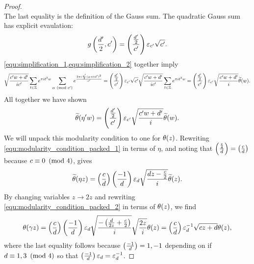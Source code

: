 \documentclass[12pt,reqno,oneside]{amsart}
\begin{document}
\begin{proof}
\begin{equation}
        \end{equation}
        The last equality is the definition of the Gauss sum. The quadratic Gauss sum has explicit evaulation:
        \begin{equation}\label{equ:simplification_2}
            g\left(\frac{d'}{2},c'\right) = \left(\frac{\frac{d'}{2}}{c'}\right)\varepsilon_{c'}\sqrt{c'}.
        \end{equation}
        \cref{equ:simplification_1,equ:simplification_2} together imply
        \[
            \sqrt{\frac{c'w+d'}{ic'}}\sum_{t \in \mathbb{Z}}e^{\pi it^{2}w}\sum_{\alpha \ \left(\text{mod }c'\right)}e^{\frac{2\pi i\frac{a'}{2}(\alpha+td')^{2}}{c'}} = \left(\frac{\frac{d'}{2}}{c'}\right)\varepsilon_{c'}\sqrt{c'}\sqrt{\frac{c'w+d'}{ic'}}\sum_{t \in \mathbb{Z}}e^{\pi it^{2}w} = \left(\frac{\frac{d'}{2}}{c'}\right)\varepsilon_{c'}\sqrt{\frac{c'w+d'}{i}}\widetilde{\theta}(w).
        \]
        All together we have shown
        \begin{equation}\label{equ:modularity_condition_packed_1}
            \widetilde{\theta}(\eta' w) = \left(\frac{\frac{d'}{2}}{c'}\right)\varepsilon_{c'}\sqrt{\frac{c'w+d'}{i}}\widetilde{\theta}(w).
        \end{equation}
        We will unpack this modularity condition to one for $\theta(z)$. Rewriting \cref{equ:modularity_condition_packed_1} in terms of $\eta$, and noting that $\textstyle{\left(\frac{\frac{c}{4}}{d}\right)} = \textstyle{\left(\frac{c}{d}\right)}$ because $c \equiv 0 \ \left(\text{mod }4\right)$, gives
        \begin{equation}\label{equ:modularity_condition_packed_2}
            \widetilde{\theta}(\eta z) = \left(\frac{c}{d}\right)\left(\frac{-1}{d}\right)\varepsilon_{d}\sqrt{\frac{dz-\frac{c}{2}}{i}}\widetilde{\theta}(z).
        \end{equation}
        By changing variables $z \to 2z$ and rewriting \cref{equ:modularity_condition_packed_2} in terms of $\theta(z)$, we find
        \[
            \theta(\gamma z) = \left(\frac{c}{d}\right)\left(\frac{-1}{d}\right)\varepsilon_{d}\sqrt{\frac{-\left(\frac{d}{2z}+\frac{c}{2}\right)}{i}}\sqrt{\frac{2z}{i}}\theta(z) = \left(\frac{c}{d}\right)\varepsilon_{d}^{-1}\sqrt{cz+d}\theta(z),
        \]
        where the last equality follows because $\left(\frac{-1}{d}\right) = 1,-1$ depending on if $d \equiv 1,3 \ \left(\text{mod }4\right)$ so that $\left(\frac{-1}{d}\right)\varepsilon_{d} = \varepsilon_{d}^{-1}$.
    \end{proof}
\end{document}
